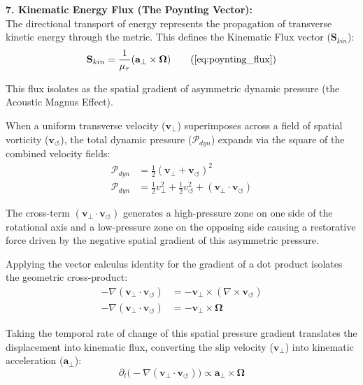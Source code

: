 \vspace{0.2 cm}

\textbf{7. Kinematic Energy Flux (The Poynting Vector):} \\
The directional transport of energy represents the propagation of transverse kinetic energy through the metric. This defines the Kinematic Flux vector ($\mathbf{S}_{kin}$): 
\begin{equation}
    \mathbf{S}_{kin} = \frac{1}{\mu_{\tau}} (\mathbf{a}_\perp \times \boldsymbol{\Omega}) \tag{\ref{eq:poynting_flux}}
\end{equation}

This flux isolates as the spatial gradient of asymmetric dynamic pressure (the Acoustic Magnus Effect). 

When a uniform transverse velocity ($\mathbf{v}_\perp$) superimposes across a field of spatial vorticity ($\mathbf{v}_\circlearrowleft$), the total dynamic pressure ($\mathcal{P}_{dyn}$) expands via the square of the combined velocity fields:
\begin{align}
    \mathcal{P}_{dyn} &= \frac{1}{2}(\mathbf{v}_\perp + \mathbf{v}_\circlearrowleft)^2 \nonumber \\
    \mathcal{P}_{dyn} &= \frac{1}{2}v_\perp^2 + \frac{1}{2}v_\circlearrowleft^2 + (\mathbf{v}_\perp \cdot \mathbf{v}_\circlearrowleft) \label{eq:asymmetric_pressure_expansion}
\end{align}

The cross-term $(\mathbf{v}_\perp \cdot \mathbf{v}_\circlearrowleft)$ generates a high-pressure zone on one side of the rotational axis and a low-pressure zone on the opposing side causing a restorative force driven by the negative spatial gradient of this asymmetric pressure. 

Applying the vector calculus identity for the gradient of a dot product isolates the geometric cross-product:
\begin{align}
    -\nabla (\mathbf{v}_\perp \cdot \mathbf{v}_\circlearrowleft) &= - \mathbf{v}_\perp \times (\nabla \times \mathbf{v}_\circlearrowleft) \nonumber \\
    -\nabla (\mathbf{v}_\perp \cdot \mathbf{v}_\circlearrowleft) &= - \mathbf{v}_\perp \times \boldsymbol{\Omega}
\end{align}

Taking the temporal rate of change of this spatial pressure gradient translates the displacement into kinematic flux, converting the slip velocity ($\mathbf{v}_\perp$) into kinematic acceleration ($\mathbf{a}_\perp$):
\begin{equation}
    \partial_t \Big( -\nabla (\mathbf{v}_\perp \cdot \mathbf{v}_\circlearrowleft) \Big) \propto \mathbf{a}_\perp \times \boldsymbol{\Omega}
\end{equation}

